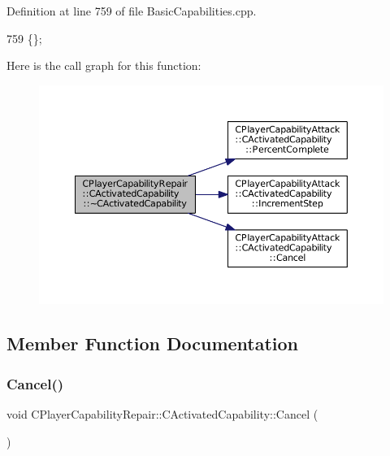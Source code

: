 Definition at line 759 of file Basic\+Capabilities.\+cpp.


\begin{DoxyCode}
759 \{\};
\end{DoxyCode}
Here is the call graph for this function\+:
\nopagebreak
\begin{figure}[H]
\begin{center}
\leavevmode
\includegraphics[width=350pt]{classCPlayerCapabilityRepair_1_1CActivatedCapability_ae4c632553e0898f8501a3f6bcd71cfaa_cgraph}
\end{center}
\end{figure}


\subsection{Member Function Documentation}
\hypertarget{classCPlayerCapabilityRepair_1_1CActivatedCapability_a719cee3446291470987f504739f63215}{}\label{classCPlayerCapabilityRepair_1_1CActivatedCapability_a719cee3446291470987f504739f63215} 
\subsubsection{\texorpdfstring{Cancel()}{Cancel()}}
{\footnotesize\ttfamily void C\+Player\+Capability\+Repair\+::\+C\+Activated\+Capability\+::\+Cancel (\begin{DoxyParamCaption}{ }\end{DoxyParamCaption})\hspace{0.3cm}{\ttfamily [virtual]}}



